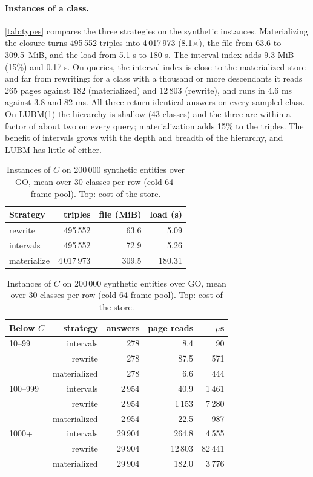 \documentclass[sigconf, nonacm]{acmart}
\begin{document}
\paragraph{Instances of a class.} \autoref{tab:types} compares the three strategies on the synthetic instances. Materializing the closure turns 495\,552 triples into 4\,017\,973 (8.1$\times$), the file from 63.6 to 309.5~MiB, and the load from 5.1 s to 180 s. The interval index adds 9.3 MiB (15\%) and 0.17 s. On queries, the interval index is close to the materialized store and far from rewriting: for a class with a thousand or more descendants it reads 265 pages against 182 (materialized) and 12\,803 (rewrite), and runs in 4.6 ms against 3.8 and 82 ms. All three return identical answers on every sampled class. On LUBM(1) the hierarchy is shallow (43 classes) and the three are within a factor of about two on every query; materialization adds 15\% to the triples. The benefit of intervals grows with the depth and breadth of the hierarchy, and LUBM has little of either.

\begin{table}[t]
\caption{Instances of $C$ on 200\,000 synthetic entities over GO, mean over 30 classes per row (cold 64-frame pool). Top: cost of the store.}
\label{tab:types}
\small
\begin{tabular}{@{}lrrr@{}}
\toprule
Strategy & triples & file (MiB) & load (s) \\
\midrule
rewrite & 495\,552 & 63.6 & 5.09 \\
intervals & 495\,552 & 72.9 & 5.26 \\
materialize & 4\,017\,973 & 309.5 & 180.31 \\
\bottomrule
\end{tabular}

\medskip
\begin{tabular}{@{}lrrrr@{}}
\toprule
Below $C$ & strategy & answers & page reads & $\mu$s \\
\midrule
10--99 & intervals & 278 & 8.4 & 90 \\
 & rewrite & 278 & 87.5 & 571 \\
 & materialized & 278 & 6.6 & 444 \\
100--999 & intervals & 2\,954 & 40.9 & 1\,461 \\
 & rewrite & 2\,954 & 1\,153 & 7\,280 \\
 & materialized & 2\,954 & 22.5 & 987 \\
1000+ & intervals & 29\,904 & 264.8 & 4\,555 \\
 & rewrite & 29\,904 & 12\,803 & 82\,441 \\
 & materialized & 29\,904 & 182.0 & 3\,776 \\
\bottomrule
\end{tabular}
\end{table}
\end{document}
